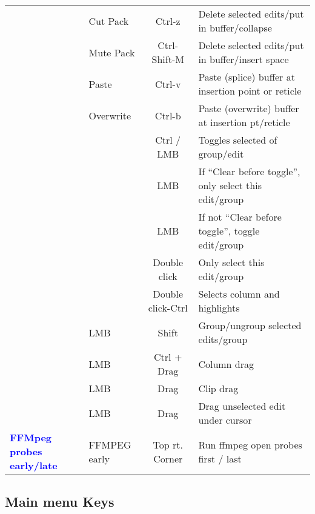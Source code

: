 \begin{center}
\begin{longtable}{ >{\bfseries}p{2cm} l c p{6cm}}
        & Cut Pack & Ctrl-z & Delete selected edits/put in buffer/collapse \\        
        & Mute Pack & Ctrl-Shift-M & Delete selected edits/put in buffer/insert space \\        
        & Paste & Ctrl-v & Paste (splice) buffer at insertion point or reticle \\        
        & Overwrite & Ctrl-b & Paste (overwrite) buffer at insertion pt/reticle \\        
        &  & Ctrl / LMB & Toggles selected of group/edit \\        
        &  & LMB & If “Clear before toggle”, only select this edit/group \\        
        &  & LMB & If not “Clear before toggle”, toggle edit/group \\        
        &  & Double click & Only select this edit/group \\        
        &  & Double click-Ctrl & Selects column and highlights \\        
        & LMB & Shift & Group/ungroup selected edits/group \\        
        & LMB & Ctrl + Drag & Column drag \\        
        & LMB & Drag & Clip drag \\        
        & LMB & Drag & Drag unselected edit under cursor \\
        \midrule
        \textcolor{blue}{FFMpeg probes early/late} & FFMPEG early & Top rt. Corner & Run ffmpeg open probes first / last \\
        
        
        \bottomrule  
    \end{longtable}
\end{center}

\subsection{Main menu Keys}%
\label{sub:main_menu_keys}

